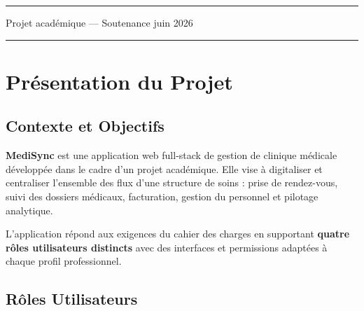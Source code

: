 \documentclass[12pt,a4paper]{report}
\begin{document}
\begin{titlepage}
  \vfill

  \noindent\textcolor{BorderGray}{\rule{\textwidth}{1pt}}
  \vspace{0.2cm}
  \begin{center}
    \small\textcolor{CommentGray}{Projet académique — Soutenance juin 2026}
  \end{center}
  \vspace{0.3cm}
  \noindent\textcolor{MedTeal}{\rule{\textwidth}{4pt}}
\end{titlepage}
\nopagecolor

\tableofcontents
\thispagestyle{empty}
\clearpage

\chapter{Présentation du Projet}

\section{Contexte et Objectifs}

\textbf{MediSync} est une application web full-stack de gestion de clinique médicale développée dans le cadre d'un projet académique. Elle vise à digitaliser et centraliser l'ensemble des flux d'une structure de soins : prise de rendez-vous, suivi des dossiers médicaux, facturation, gestion du personnel et pilotage analytique.

L'application répond aux exigences du cahier des charges en supportant \textbf{quatre rôles utilisateurs distincts} avec des interfaces et permissions adaptées à chaque profil professionnel.

\section{Rôles Utilisateurs}
\end{document}
